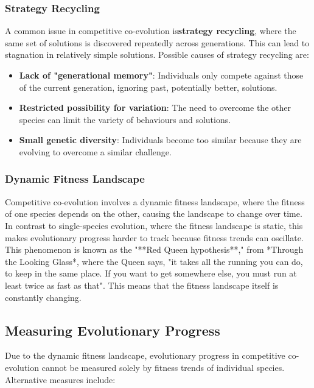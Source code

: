 \subsubsection*{Strategy Recycling}

A common issue in competitive co-evolution is\textbf{strategy recycling}, where the same set of solutions is discovered repeatedly across generations. This can lead to stagnation in relatively simple solutions.
Possible causes of strategy recycling are:
\begin{itemize}
    \item \textbf{Lack of "generational memory"}: Individuals only compete against those of the current generation, ignoring past, potentially better, solutions.
    \item \textbf{Restricted possibility for variation}: The need to overcome the other species can limit the variety of behaviours and solutions.
    \item \textbf{Small genetic diversity}: Individuals become too similar because they are evolving to overcome a similar challenge.
\end{itemize}

\subsubsection*{Dynamic Fitness Landscape}

Competitive co-evolution involves a dynamic fitness landscape, where the fitness of one species depends on the other, causing the landscape to change over time. In contrast to single-species evolution, where the fitness landscape is static, this makes evolutionary progress harder to track because fitness trends can oscillate.
This phenomenon is known as the "**Red Queen hypothesis**," from *Through the Looking Glass*, where the Queen says, "it takes all the running you can do, to keep in the same place. If you want to get somewhere else, you must run at least twice as fast as that". This means that the fitness landscape itself is constantly changing.

\subsection*{Measuring Evolutionary Progress}

Due to the dynamic fitness landscape, evolutionary progress in competitive co-evolution cannot be measured solely by fitness trends of individual species. Alternative measures include:

